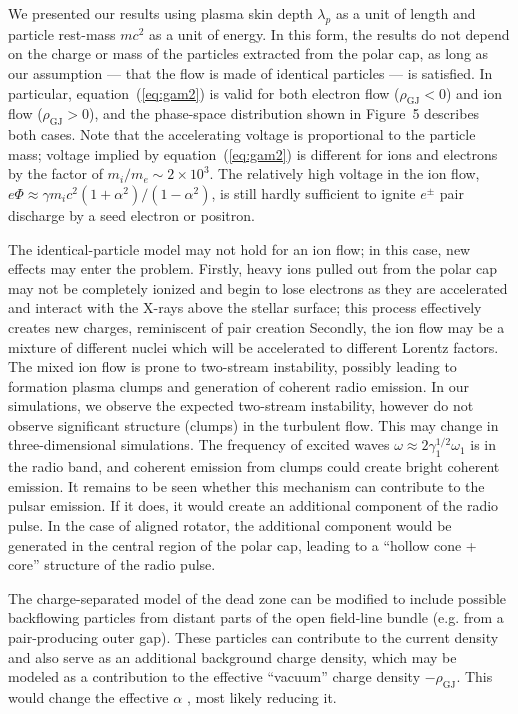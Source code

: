We presented our results using plasma skin depth $\lambda_p$ as a unit of
length and particle rest-mass $mc^2$ as a unit of energy. In this form, the results
do not depend on the charge or mass of the particles extracted from the polar cap,
as long as our assumption --- that the flow is made of identical particles --- is
satisfied. In particular, equation~(\ref{eq:gam2}) is valid for both electron flow
($\rho_\mathrm{GJ}<0$) and ion flow ($\rho_\mathrm{GJ}>0$), and the phase-space
distribution shown in Figure~5 describes both cases.
Note that the accelerating voltage is proportional to the particle mass;
voltage implied by equation~(\ref{eq:gam2}) is different for ions and electrons by
the factor of $m_i/m_e\sim 2\times 10^3$.
The relatively high voltage in the ion flow,
$e\Phi\approx\gamma m_ic^2 (1+\alpha^2)/(1-\alpha^2)$,
is still hardly sufficient to ignite $e^\pm$ pair discharge by a seed electron or positron.

The identical-particle model may not hold for an ion flow; in this case,
new effects may enter the problem.
Firstly, heavy ions pulled out from the polar cap may not be completely ionized
and begin to lose electrons as they are accelerated and interact with the X-rays
above the stellar surface; this process effectively creates new charges,
reminiscent of pair creation
\citep[e.g.][]{jones_post-glitch_2002}
Secondly, the ion flow may be a
mixture of different nuclei which will be accelerated to different Lorentz factors.
The mixed ion flow is prone to two-stream instability, possibly leading to formation
plasma clumps and generation of coherent radio emission.
In our simulations, we observe the expected two-stream instability,
however do not observe significant structure (clumps) in the turbulent flow.
This may change in three-dimensional simulations.
The frequency of excited waves $\omega\approx 2\gamma_1^{1/2}\omega_1$
is in the radio band, and coherent emission from clumps could create bright
coherent emission. It remains to be seen whether this mechanism
can contribute to the pulsar emission. If it does,
it would create an additional component of the radio pulse.
In the case of aligned rotator, the additional component would be generated in
the central region of the polar cap, leading to a ``hollow cone + core'' structure of
the radio pulse.

The charge-separated model of the dead zone can be modified to include possible
backflowing particles from distant parts of the open field-line bundle
(e.g. from a pair-producing outer gap). These particles can contribute to the current
density and also serve as an
additional background charge density, which may be modeled as a contribution to the
effective ``vacuum'' charge density  $-\rho_\mathrm{GJ}$.
This would change the effective $\alpha$
\citep[][B08]{lyubarskij_current_1992},
most likely reducing it.

